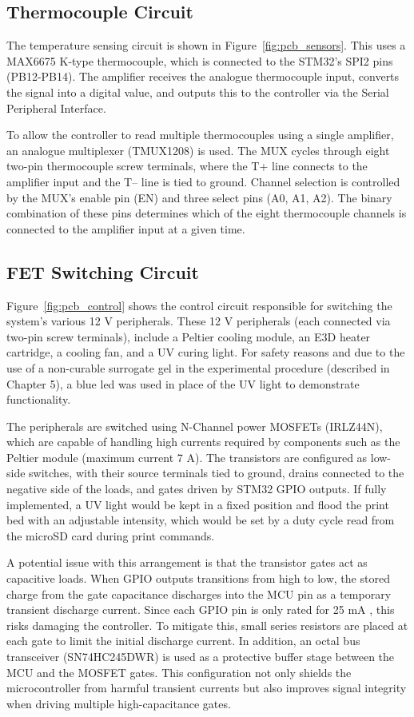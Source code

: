 \subsection{Thermocouple Circuit}
The temperature sensing circuit is shown in Figure~\ref{fig:pcb_sensors}. This uses a MAX6675 K-type thermocouple, which is connected to the STM32's SPI2 pins (PB12-PB14). The amplifier receives the analogue thermocouple input, converts the signal into a digital value, and outputs this to the controller via the Serial Peripheral Interface. 

To allow the controller to read multiple thermocouples using a single amplifier, an analogue multiplexer (TMUX1208) is used. The MUX cycles through eight two-pin thermocouple screw terminals, where the T+ line connects to the amplifier input and the T– line is tied to ground. Channel selection is controlled by the MUX’s enable pin (EN) and three select pins (A0, A1, A2). The binary combination of these pins determines which of the eight thermocouple channels is connected to the amplifier input at a given time.

\subsection{FET Switching Circuit}
Figure~\ref{fig:pcb_control} shows the control circuit responsible for switching the system's various 12 V peripherals. These 12 V peripherals (each connected via two-pin screw terminals), include a Peltier cooling module, an E3D heater cartridge, a cooling fan, and a UV curing light. For safety reasons and due to the use of a non-curable surrogate gel in the experimental procedure (described in Chapter 5), a blue led was used in place of the UV light to demonstrate functionality. 

The peripherals are switched using N-Channel power MOSFETs (IRLZ44N), which are capable of handling high currents required by components such as the Peltier module (maximum current 7 A). The transistors are configured as low-side switches, with their source terminals tied to ground, drains connected to the negative side of the loads, and gates driven by STM32 GPIO outputs. If fully implemented, a UV light would be kept in a fixed position and flood the print bed with an adjustable intensity, which would be set by a duty cycle read from the microSD card during print commands.

A potential issue with this arrangement is that the transistor gates act as capacitive loads. When GPIO outputs transitions from high to low, the stored charge from the gate capacitance discharges into the MCU pin as a temporary transient discharge current. Since each GPIO pin is only rated for 25 mA \citep{ST_STM32F405F407_datasheet}, this risks damaging the controller. To mitigate this, small series resistors are placed at each gate to limit the initial discharge current.  In addition, an octal bus transceiver (SN74HC245DWR) is used as a protective buffer stage between the MCU and the MOSFET gates. This configuration not only shields the microcontroller from harmful transient currents but also improves signal integrity when driving multiple high-capacitance gates.

